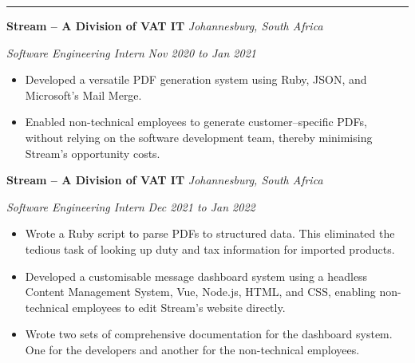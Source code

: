 \documentclass[10pt, a4paper]{article}
\newcommand{\rangesep}{to\xspace}  %
\renewcommand{\date}[1]{\textit{#1}}
\newcommand{\location}[1]{\textit{#1}}
\newcommand{\heading}[1]{
\makebox[0pt][l]{\Large \sc \hspace{2pt}#1}
\rule[-0.7ex]{\columnwidth}{0.5pt}\vspace{1.0ex}
}
\newcommand{\subheading}[1]{{\bfseries #1}}
\newcommand{\subheadSkip}{\vspace{0.7ex}}
\newenvironment{mysection}[1]
{\vspace{2.5ex}
\heading{#1}
\begin{adjustwidth}{0.3cm}{0cm}}
{\end{adjustwidth} }
\begin{document}
\begin{mysection}{Experience}
 \subheadSkip
        \subheading{Stream -- A Division of VAT IT} \hfill \location{Johannesburg, South Africa}

        \textit{Software Engineering Intern}  \hfill \date{Nov 2020 \rangesep Jan 2021}

        \begin{itemize}
            \item Developed a versatile PDF generation system using Ruby, JSON, and Microsoft's Mail Merge.
            \item Enabled non-technical employees to generate customer--specific PDFs, without relying on the software development team, thereby minimising Stream's opportunity costs.
        \end{itemize}   
\subheadSkip
        \subheading{Stream -- A Division of VAT IT} \hfill \location{Johannesburg, South Africa}

        \textit{Software Engineering Intern}  \hfill \date{Dec 2021 \rangesep Jan 2022}

        \begin{itemize}
         \item Wrote a Ruby script to parse PDFs to structured data. This eliminated the tedious task of looking up duty and tax information for imported products.
    \item Developed a customisable message dashboard system using a headless Content Management System, Vue, Node.js, HTML, and CSS, enabling non-technical employees to edit Stream's website directly.
    \item Wrote two sets of comprehensive documentation for the dashboard system. One for the developers and another for the non-technical employees.
        \end{itemize}           
\end{mysection}
\end{document}
